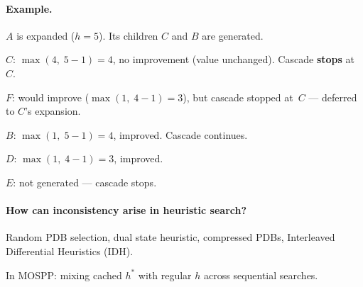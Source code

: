 \documentclass[11pt, a4paper]{article}
\newcommand{\tagfelner}{%
    {\footnotesize\colorbox{felnerbg}{%
    \textcolor{felner}{\textsf{\textbf{Felner 2011}}}}}%
}
\begin{document}
\begin{center}
\end{center}

\vspace{6pt}

\paragraph{Example.}
\begin{sentences}
\item $A$ is expanded ($h\!=\!5$). Its children $C$
      and $B$ are generated.
\item $C$: $\max(4,\;5\!-\!1) = 4$, no improvement
      (value unchanged). Cascade \textbf{stops} at~$C$.
\item $F$: would improve
      ($\max(1,\;4\!-\!1)=3$), but cascade stopped
      at~$C$ --- deferred to $C$'s expansion.
\item $B$: $\max(1,\;5\!-\!1) = 4$, improved.
      Cascade continues.
\item $D$: $\max(1,\;4\!-\!1) = 3$, improved.
\item $E$: not generated --- cascade stops.
\end{sentences}

\vspace{6pt}

\paragraph{How can inconsistency arise in heuristic search?}
\begin{sentences}
\item[\tagfelner] Random PDB selection, dual state
      heuristic, compressed PDBs, Interleaved
      Differential Heuristics (IDH).
\item In MOSPP: mixing cached $h^*$ with
      regular $h$ across sequential searches.
\end{sentences}
\end{document}
